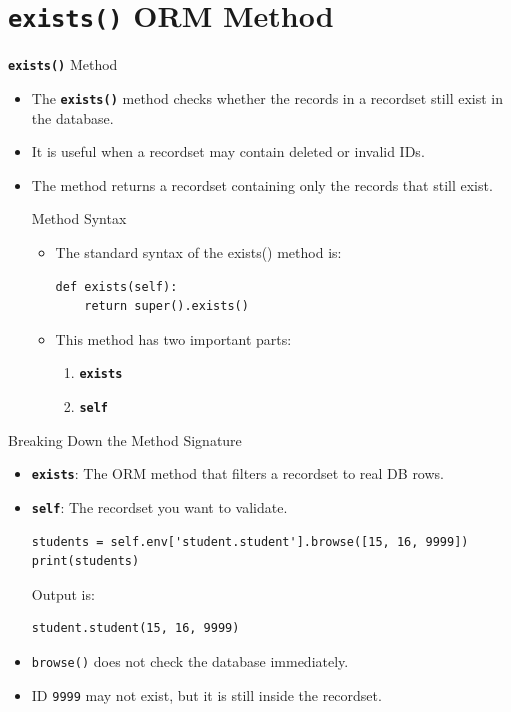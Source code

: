 
\section{\textbf{\texttt{exists()}} ORM Method}

\begin{frame}[fragile]{\textbf{\texttt{exists()}} Method}
	\begin{itemize}
		\item The \textbf{\texttt{exists()}} method checks whether the records in a recordset still exist in the database.
		\item It is useful when a recordset may contain deleted or invalid IDs.
		\item The method returns a recordset containing only the records that still exist.
\begin{block}{Method Syntax}
	\begin{itemize}
		\item The standard syntax of the exists() method is:
\begin{lstlisting}
def exists(self):
	return super().exists()
\end{lstlisting}
		\item This method has two important parts:
		\begin{enumerate}
			\item \textbf{\texttt{exists}}
			\item \textbf{\texttt{self}}
		\end{enumerate}
	\end{itemize}
\end{block}
	\end{itemize}
\end{frame}

\begin{frame}[fragile]{Breaking Down the Method Signature}
	\begin{block}{}
		\begin{itemize}
			\item \textbf{\texttt{exists}}: The ORM method that filters a recordset to real DB rows.
			\item \textbf{\texttt{self}}: The recordset you want to validate.
\begin{lstlisting}
students = self.env['student.student'].browse([15, 16, 9999])
print(students)
\end{lstlisting}
			Output is:
\begin{lstlisting}
student.student(15, 16, 9999)
\end{lstlisting}
			\item \texttt{browse()} does not check the database immediately.
			\item ID \texttt{9999} may not exist, but it is still inside the recordset.
		\end{itemize}
	\end{block}
\end{frame}

